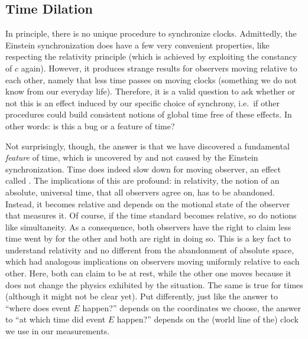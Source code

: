 \documentclass[../relativity_main.tex]{subfiles}
\begin{document}
		\subsection{Time Dilation}
In principle, there is no unique procedure to synchronize clocks. Admittedly, the Einstein synchronization does have a few very convenient properties, like respecting the relativity principle (which is achieved by exploiting the constancy of $c$ again). However, it produces strange results for observers moving relative to each other, namely that less time passes on moving clocks (something we do not know from our everyday life). Therefore, it is a valid question to ask whether or not this is an effect induced by our specific choice of synchrony, i.e.~if other procedures could build consistent notions of global time free of these effects. In other words: is this a bug or a feature of time?


Not surprisingly, though, the answer is that we have discovered a fundamental \emph{feature} of time, which is uncovered by and not caused by the Einstein synchronization. Time does indeed slow down for moving observer, an effect called . The implications of this are profound: in relativity, the notion of an absolute, universal time, that all observers agree on, has to be abandoned. Instead, it becomes relative and depends on the motional state of the observer that measures it. Of course, if the time standard becomes relative, so do notions like simultaneity. As a consequence, both observers have the right to claim less time went by for the other and both are right in doing so. This is a key fact to understand relativity and no different from the abandonment of absolute space, which had analogous implications on observers moving uniformly relative to each other. Here, both can claim to be at rest, while the other one moves because it does not change the physics exhibited by the situation. The same is true for times (although it might not be clear yet). Put differently, just like the answer to \enquote{where does event $E$ happen?} depends on the coordinates we choose, the answer to \enquote{at which time did event $E$ happen?} depends on the (world line of the) clock we use in our measurements.

\end{document}
